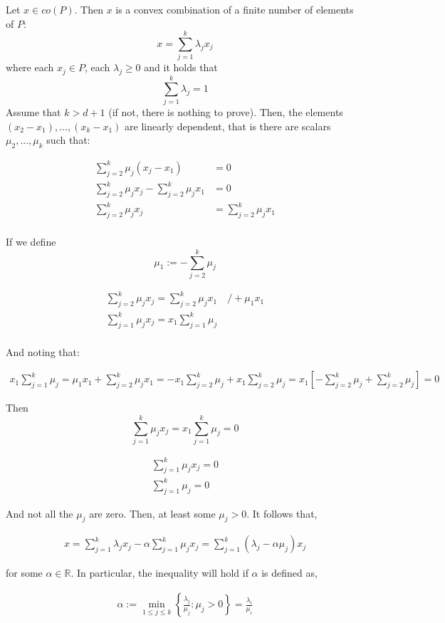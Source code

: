 \documentclass[answers]{exam}
\theoremstyle{definition}
\begin{document}
\begin{questions}
\begin{solution}
Let $x\in co(P)$. Then $x$ is a convex combination of a finite number of elements of $P$: $$x=\sum_{j=1}^{k}\lambda_j x_j$$ where each $x_j\in P$, each $\lambda_j\geq0$ and it holds that $$\sum_{j=1}^{k}\lambda_j=1$$ Assume that $k>d+1$ (if not, there is nothing to prove). Then, the elements $(x_2-x_1),...,(x_k-x_1)$ are linearly dependent, that is there are scalars $\mu_2,...,\mu_k$ such that:

\begin{align*}
    \sum_{j=2}^{k}\mu_j(x_j-x_1)&=0\\
    \sum_{j=2}^{k}\mu_j x_j-\sum_{j=2}^{k}\mu_jx_1&=0\\
    \sum_{j=2}^{k}\mu_j x_j&=\sum_{j=2}^{k}\mu_jx_1\\
\end{align*}

If we define $$\mu_1:=-\sum_{j=2}^{k}\mu_j$$

\begin{align*}
    \sum_{j=2}^{k}\mu_j x_j=\sum_{j=2}^{k}\mu_jx_1\quad/+\mu_1x_1\\
    \sum_{j=1}^{k}\mu_j x_j=x_1\sum_{j=1}^{k}\mu_j\\
\end{align*}

And noting that:

\begin{align*}
    x_1\sum_{j=1}^{k}\mu_j=\mu_1x_1+\sum_{j=2}^{k}\mu_j x_1=-x_1\sum_{j=2}^{k}\mu_j+x_1\sum_{j=2}^{k}\mu_j=x_1\left[-\sum_{j=2}^{k}\mu_j+\sum_{j=2}^{k}\mu_j\right]=0
\end{align*}

Then $$\sum_{j=1}^{k}\mu_j x_j=x_1\sum_{j=1}^{k}\mu_j=0$$

\begin{align*}
    \sum_{j=1}^{k}\mu_j x_j=0\\
    \sum_{j=1}^{k}\mu_j=0
\end{align*}

And not all the $\mu_j$ are zero. Then, at least some $\mu_j>0$. It follows that,

\begin{align*}
    x=\sum_{j=1}^{k}\lambda_jx_j-\alpha\sum_{j=1}^{k}\mu_jx_j=\sum_{j=1}^{k}(\lambda_j-\alpha\mu_j)x_j
\end{align*}

for some $\alpha\in\mathds{R}$. In particular, the inequality will hold if $\alpha$ is defined as,

\begin{align*}
    \alpha:=\min_{1\leq j\leq k}\left\{\frac{\lambda_j}{\mu_j}:\mu_j>0\right\}=\frac{\lambda_i}{\mu_i}
\end{align*}


\end{solution}
\end{questions}
\end{document}
